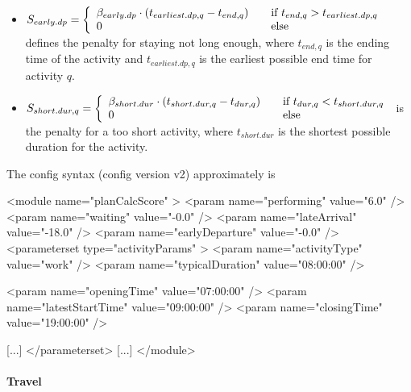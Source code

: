 \begin{itemize}
\medskip

\item $S_{early.dp} = \left\{
  \begin{array}{l l}
    \beta_{early.dp} \cdot (t_{earliest.dp, q} - t_{end,q}) & \quad \text{if $t_{end,q} > t_{earliest.dp,q}$}\\
    0 & \quad \text{else}
  \end{array} \right.$
%
defines the penalty for staying not long enough, where $t_{end,q}$ is the ending time of the activity and $t_{earliest.dp,q}$ is the earliest possible end time for activity $q$.

\medskip

\item $ S_{short.dur, q} = \left\{
  \begin{array}{l l}
    \beta_{short.dur} \cdot (t_{short.dur, q} - t_{dur,q}) & \quad \text{if $t_{dur,q} < t_{short.dur,q}$}\\
    0 & \quad \text{else}
  \end{array} \right.$
%  
  is the penalty for a too short activity, where $t_{short.dur}$ is the shortest possible duration for the activity.
\end{itemize}

The config syntax (config version v2) approximately is
\begin{xml}
<module name="planCalcScore" >
   <param name="performing" value="6.0" />
   <param name="waiting" value="-0.0" />
   <param name="lateArrival" value="-18.0" />
   <param name="earlyDeparture" value="-0.0" />
   <parameterset type="activityParams" >
      <param name="activityType" value="work" />
      <param name="typicalDuration" value="08:00:00" />

      <param name="openingTime" value="07:00:00" />
      <param name="latestStartTime" value="09:00:00" />
      <param name="closingTime" value="19:00:00" />

      [...]   
   </parameterset>
   [...]   
</module>
\end{xml}


\paragraph{Travel} 

